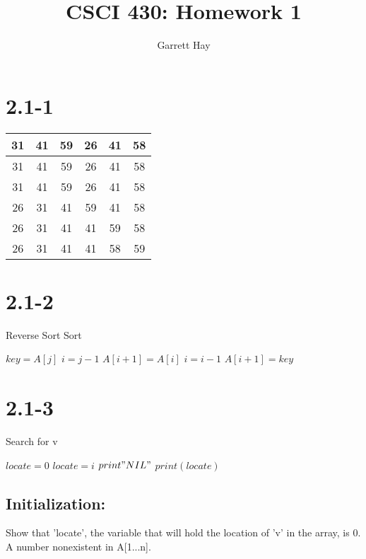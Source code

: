 \documentclass[12pt]{article}
\author{Garrett Hay}
\title{CSCI 430: Homework 1}
\begin{document}
\maketitle

\section*{2.1-1}
\noindent    
\begin{tabular}{| c | c | c | c | c | c |}
      \hline
      31 & 41 & 59 & 26 & 41 & 58 \\
      \hline
      31 & 41 & 59 & 26 & 41 & 58 \\
      \hline
      31 & 41 & 59 & 26 & 41 & 58 \\
      \hline
      26 & 31 & 41 & 59 & 41 & 58 \\
      \hline
      26 & 31 & 41 & 41 & 59 & 58 \\
      \hline
      26 & 31 & 41 & 41 & 58 & 59 \\
      \hline
\end{tabular}
    
\section*{2.1-2}
\begin{algorithm}
\caption{Reverse Sort Sort}
\begin{algorithmic}
	\STATE $ key = A[j] $
   	\STATE $ i = j-1 $
   		\STATE $ A[i+1] = A[i] $
   		\STATE $ i = i-1 $
   	\ENDWHILE
   	\STATE $ A[i+1] = key $
\ENDFOR
\end{algorithmic}
\end{algorithm}

\newpage
\section*{2.1-3}
\noindent
\begin{algorithm}
\caption{Search for v}
\begin{algorithmic}
\STATE $locate = 0$
   		\STATE $locate = i$
   	\ENDIF
\ENDFOR
{}
   	\STATE $print "NIL"$
\ELSE
   	\STATE $print(locate)$
\ENDIF
\end{algorithmic}
\end{algorithm}
	\subsection*{Initialization:}
    Show that 'locate', the variable that will hold the location of 'v' in the array, is 0. A number nonexistent in A[1...n].
\end{document}
